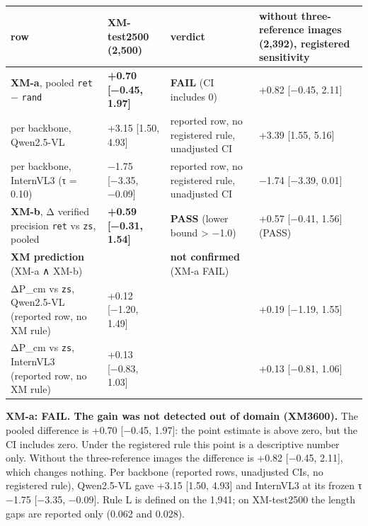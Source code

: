 \documentclass[manuscript,screen]{acmart}
\begin{document}
\begin{longtable}[]{@{}
  >{\raggedright\arraybackslash}p{}
  >{\raggedright\arraybackslash}p{}
  >{\raggedright\arraybackslash}p{}
  >{\raggedright\arraybackslash}p{}@{}}
\toprule\noalign{}
\begin{minipage}[b]{\linewidth}\raggedright
row
\end{minipage} & \begin{minipage}[b]{\linewidth}\raggedright
XM-test2500 (2,500)
\end{minipage} & \begin{minipage}[b]{\linewidth}\raggedright
verdict
\end{minipage} & \begin{minipage}[b]{\linewidth}\raggedright
without three-reference images (2,392), registered sensitivity
\end{minipage} \\
\midrule\noalign{}
\endhead
\bottomrule\noalign{}
\endlastfoot
\textbf{XM-a}, pooled \texttt{ret} − \texttt{rand} & \textbf{+0.70 {[}−0.45, 1.97{]}} &
\textbf{FAIL} (CI includes 0) & +0.82 {[}−0.45, 2.11{]} \\
per backbone, Qwen2.5-VL & +3.15 {[}1.50, 4.93{]} & reported row, no registered rule, unadjusted CI
& +3.39 {[}1.55, 5.16{]} \\
per backbone, InternVL3 (τ = 0.10) & −1.75 {[}−3.35, −0.09{]} & reported row, no registered rule,
unadjusted CI & −1.74 {[}−3.39, 0.01{]} \\
\textbf{XM-b}, Δ verified precision \texttt{ret} vs \texttt{zs}, pooled & \textbf{+0.59 {[}−0.31,
1.54{]}} & \textbf{PASS} (lower bound \textgreater{} −1.0) & +0.57 {[}−0.41, 1.56{]} (PASS) \\
\textbf{XM prediction} (XM-a ∧ XM-b) & & \textbf{not confirmed} (XM-a FAIL) & \\
ΔP\_cm vs \texttt{zs}, Qwen2.5-VL (reported row, no XM rule) & +0.12 {[}−1.20, 1.49{]} & & +0.19
{[}−1.19, 1.55{]} \\
ΔP\_cm vs \texttt{zs}, InternVL3 (reported row, no XM rule) & +0.13 {[}−0.83, 1.03{]} & & +0.13
{[}−0.81, 1.06{]} \\
\end{longtable}

\textbf{XM-a: FAIL. The gain was not detected out of domain (XM3600).} The pooled difference is
+0.70 {[}−0.45, 1.97{]}: the point estimate is above zero, but the CI includes zero. Under the
registered rule this point is a descriptive number only. Without the three-reference images the
difference is +0.82 {[}−0.45, 2.11{]}, which changes nothing. Per backbone (reported rows,
unadjusted CIs, no registered rule), Qwen2.5-VL gave +3.15 {[}1.50, 4.93{]} and InternVL3 at its
frozen τ −1.75 {[}−3.35, −0.09{]}. Rule L is defined on the 1,941; on XM-test2500 the length gaps
are reported only (0.062 and 0.028).
\end{document}
